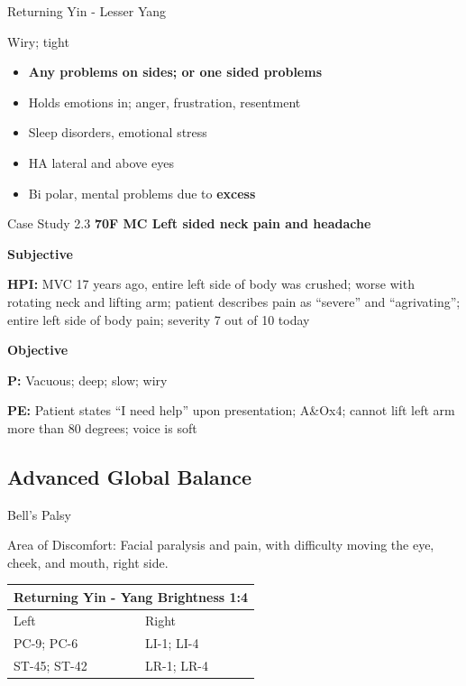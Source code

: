 \begin{frame}{Returning Yin - Lesser Yang}

\begin{pulse}
Wiry; tight
\end{pulse}

\begin{itemize}
\item \textbf{Any problems on sides; or one sided problems}
\item Holds emotions in; anger, frustration, resentment
\item Sleep disorders, emotional stress
\item HA lateral and above eyes
\item Bi polar, mental problems due to \textbf{excess}
\end{itemize}

\end{frame}

\begin{frame}{Case Study 2.3}
  \textbf{\Large 70F MC Left sided neck pain and headache}
  
  \textbf{\large Subjective}
  
  \textbf{HPI:} MVC 17 years ago, entire left side of body was crushed; worse with rotating neck and lifting arm; patient describes pain as ``severe'' and ``agrivating''; entire left side of body pain; severity 7 out of 10 today

  \textbf{\large Objective}
  
  \textbf{P:} Vacuous; deep; slow; wiry 

  \textbf{PE:} Patient states ``I need help'' upon presentation; A\&Ox4; cannot lift left arm more than 80 degrees; voice is soft
\end{frame}

\subsection{Advanced Global Balance}

\begin{frame}{Bell's Palsy}

Area of Discomfort: Facial paralysis and pain, with difficulty moving the eye, cheek, and mouth, right side.

\begin{table}[]
\begin{tabular}{@{}ll@{}}
\toprule
\multicolumn{2}{l}{Returning Yin - Yang Brightness 1:4} \\ \midrule
Left                        & Right                     \\
PC-9; PC-6                  & LI-1; LI-4                \\
ST-45; ST-42                & LR-1; LR-4                \\ \bottomrule
\end{tabular}
\end{table}

\end{frame}

